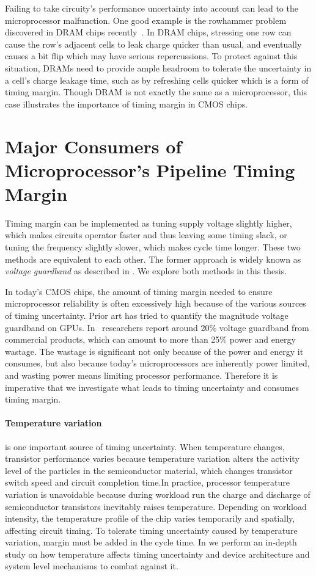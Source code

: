 Failing to take circuity's performance uncertainty into account can lead to the microprocessor malfunction. One good example is the rowhammer problem discovered in DRAM chips recently~\cite{kim2014flipping}. In DRAM chips, stressing one row can cause the row's adjacent cells to leak charge quicker than usual, and eventually causes a bit flip which may have serious repercussions. To protect against this situation, DRAMs need to provide ample headroom to tolerate the uncertainty in a cell's charge leakage time, such as by refreshing cells quicker which is a form of timing margin. Though DRAM is not exactly the same as a microprocessor, this case illustrates the importance of timing margin in CMOS chips.

\section{Major Consumers of Microprocessor's Pipeline Timing Margin}
\label{sec:background:components}

Timing margin can be implemented as tuning supply voltage slightly higher, which makes circuits operator faster and thus leaving some timing slack, or tuning the frequency slightly slower, which makes cycle time longer. These two methods are equivalent to each other. The former approach is widely known as \textit{voltage guardband} as described in . We explore both methods in this thesis.

In today's CMOS chips, the amount of timing margin needed to ensure microprocessor reliability is often excessively high because of the various sources of timing uncertainty. Prior art has tried to quantify the magnitude voltage guardband on GPUs. In~\cite{leng2015safe} researchers report around 20\% voltage guardband from commercial products, which can amount to more than 25\% power and energy wastage. The wastage is significant not only because of the power and energy it consumes, but also because today's microprocessors are inherently power limited, and wasting power means limiting processor performance. Therefore it is imperative that we investigate what leads to timing uncertainty and consumes timing margin. 

\paragraph{Temperature variation} is one important source of timing uncertainty. When temperature changes, transistor performance varies because temperature variation alters the activity level of the particles in the semiconductor material, which changes transistor switch speed and circuit completion time.In practice, processor temperature variation is unavoidable because during workload run the charge and discharge of semiconductor transistors inevitably raises temperature. Depending on workload intensity, the temperature profile of the chip varies temporarily and spatially, affecting circuit timing. To tolerate timing uncertainty caused by temperature variation, margin must be added in the cycle time. In \label{sec:tistate} we perform an in-depth study on how temperature affects timing uncertainty and device architecture and system level mechanisms to combat against it.

